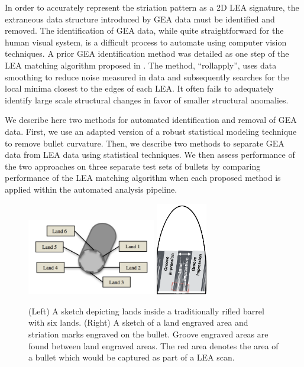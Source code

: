 \documentclass[12pt]{article}
\begin{document}
In order to accurately represent the striation pattern as a 2D LEA
signature, the extraneous data structure introduced by GEA data must be
identified and removed. The identification of GEA data, while quite
straightforward for the human visual system, is a difficult process to
automate using computer vision techniques. A prior GEA identification
method was detailed as one step of the LEA matching algorithm proposed
in \citet{Hare1}. The method, ``rollapply'', uses data smoothing to
reduce noise measured in data and subsequently searches for the local
minima closest to the edges of each LEA. It often fails to adequately
identify large scale structural changes in favor of smaller structural
anomalies.

We describe here two methods for automated identification and removal of
GEA data. First, we use an adapted version of a robust statistical
modeling technique to remove bullet curvature. Then, we describe two
methods to separate GEA data from LEA data using statistical techniques.
We then assess performance of the two approaches on three separate test
sets of bullets by comparing performance of the \citet{Hare1} LEA
matching algorithm when each proposed method is applied within the
automated analysis pipeline.

\begin{figure}

\includegraphics[width=0.5\textwidth]{../images/scanning-stage0}
\hspace{3cm}
\includegraphics[width=0.2\textwidth]{../images/bullet-sketch}
\caption{(Left) A sketch depicting lands inside a traditionally rifled barrel with six lands. (Right) A sketch of a land engraved area and striation marks engraved on the bullet. Groove engraved areas are found between land engraved areas. The red area denotes the area of a bullet which would be captured as part of a LEA scan.}
\label{barrel-bullet}
\end{figure}
\end{document}
